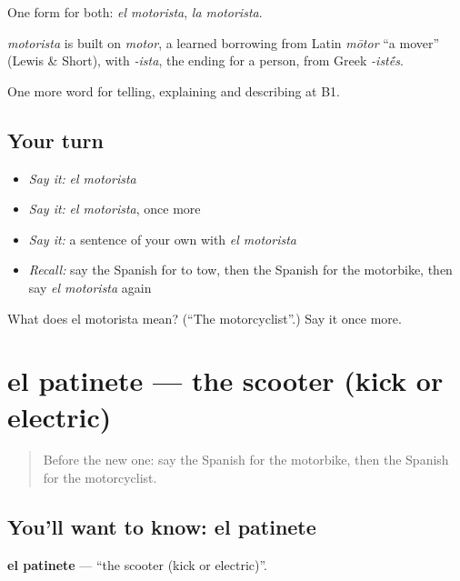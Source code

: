 One form for both: \emph{el motorista}, \emph{la motorista}.

\begin{cousinweb}
\emph{motorista} is built on \emph{motor}, a learned borrowing from Latin \emph{mōtor} \textquotedblleft{}a mover\textquotedblright{} (Lewis \& Short), with \emph{-ista}, the ending for a person, from Greek \emph{-ist\'{\={e}}s}.
\end{cousinweb}

\begin{grammarlens}[title={What you've built}]
One more word for telling, explaining and describing at B1.
\end{grammarlens}

\subsection*{Your turn}
\begin{itemize}
\raggedright
  \item \emph{Say it:} \emph{el motorista}
  \item \emph{Say it:} \emph{el motorista}, once more
  \item \emph{Say it:} a sentence of your own with \emph{el motorista}
  \item \emph{Recall:} say the Spanish for to tow, then the Spanish for the motorbike, then say \emph{el motorista} again
\end{itemize}

\begin{tcolorbox}[breakable,colback=teal!4,colframe=teal!35!black,title={Before you move on}]
What does el motorista mean? (\textquotedblleft{}The motorcyclist\textquotedblright{}.) Say it once more.
\end{tcolorbox}
\section[el patinete]{el patinete — the scooter (kick or electric)}

\label{lesson:ES-C649-patinete}



\begin{quote}
Before the new one: say the Spanish for the motorbike, then the Spanish for the motorcyclist.
\end{quote}

\subsection*{You'll want to know: el patinete}
\textbf{el patinete} — \textquotedblleft{}the scooter (kick or electric)\textquotedblright{}.

